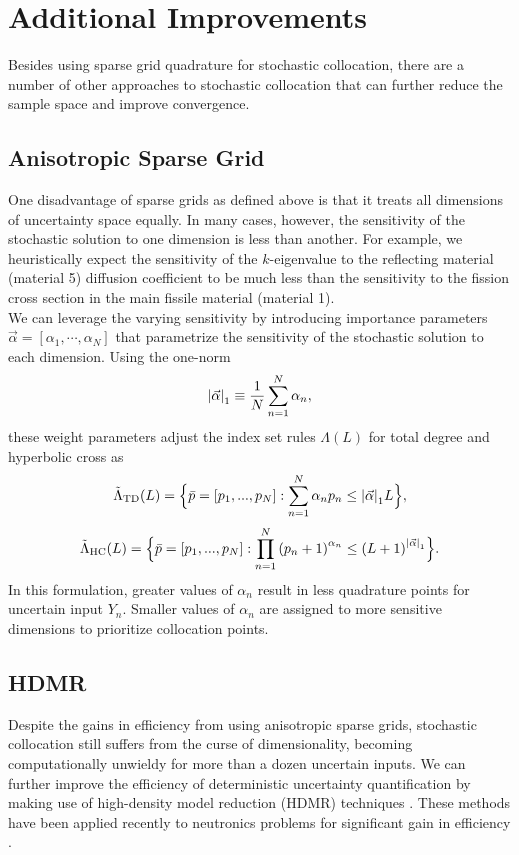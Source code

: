 \documentclass{mc2015}
\begin{document}
\section{Additional Improvements}
Besides using sparse grid quadrature for stochastic collocation, there are a number of other approaches to stochastic collocation that can further reduce the sample space and improve convergence.

\subsection{Anisotropic Sparse Grid}
One disadvantage of sparse grids as defined above is that it treats all dimensions of uncertainty space equally.  In many cases, however, the sensitivity of the stochastic solution to one dimension is less than another.  For example, we heuristically expect the sensitivity of the $k$-eigenvalue to the reflecting material (material 5) diffusion coefficient to be much less than the sensitivity to the fission cross section in the main fissile material (material 1).  \\

We can leverage the varying sensitivity by introducing importance parameters $\vec\alpha=[\alpha_1,\cdots,\alpha_N]$ that parametrize the sensitivity of the stochastic solution to each dimension.  Using the one-norm
\begin{equation}
\qty|\vec\alpha|_1\equiv\frac{1}{N}\sum_{n=1}^N \alpha_n,
\end{equation}
these weight parameters adjust the index set rules $\Lambda(L)$ for total degree and hyperbolic cross as
\begin{equation}
\tilde\Lambda_\text{TD}(L)=\Big\{\bar p=[p_1,...,p_N]:\sum_{n=1}^N \alpha_n p_n \leq \qty|\vec\alpha|_1 L \Big\},
\end{equation}
\begin{equation}
\tilde\Lambda_\text{HC}(L)=\Big\{\bar p=[p_1,...,p_N]:\prod_{n=1}^N \qty(p_n+1)^{\alpha_n} \leq \qty(L+1)^{\qty|\vec\alpha|_1} \Big\}.
\end{equation}
In this formulation, greater values of $\alpha_n$ result in less quadrature points for uncertain input $Y_n$.  Smaller values of $\alpha_n$ are assigned to more sensitive dimensions to prioritize collocation points.


\subsection{HDMR}
Despite the gains in efficiency from using anisotropic sparse grids, stochastic collocation still suffers from the curse of dimensionality, becoming computationally unwieldy for more than a dozen uncertain inputs.  We can further improve the efficiency of deterministic uncertainty quantification by making use of high-density model reduction (HDMR) techniques \cite{hdmr}.  These methods have been applied recently to neutronics problems for significant gain in efficiency \cite{hdmr_neutron}.\\
\end{document}
